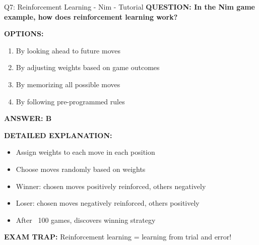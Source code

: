 \documentclass[8pt]{beamer}
\begin{document}
	\begin{frame}{Q7: Reinforcement Learning - Nim - Tutorial}
		\fontsize{6.5}{7.5}\selectfont
		\textbf{QUESTION: In the Nim game example, how does reinforcement learning work?}
		
		\vspace{0.1cm}
		\textbf{OPTIONS:}
		\begin{enumerate}
			\item By looking ahead to future moves
			\item By adjusting weights based on game outcomes
			\item By memorizing all possible moves
			\item By following pre-programmed rules
		\end{enumerate}
		
		\vspace{0.1cm}
		\textcolor{myblue}{\textbf{ANSWER: B}}
		
		\vspace{0.1cm}
		\textbf{DETAILED EXPLANATION:}
		\begin{itemize}
			\item Assign weights to each move in each position
			\item Choose moves randomly based on weights
			\item Winner: chosen moves positively reinforced, others negatively
			\item Loser: chosen moves negatively reinforced, others positively
			\item After ~100 games, discovers winning strategy
		\end{itemize}
		
		\vspace{0.1cm}
		\textcolor{myred}{\textbf{EXAM TRAP:}} Reinforcement learning = \textcolor{myblue}{learning from trial and error}!
	\end{frame}
	
\end{document}
